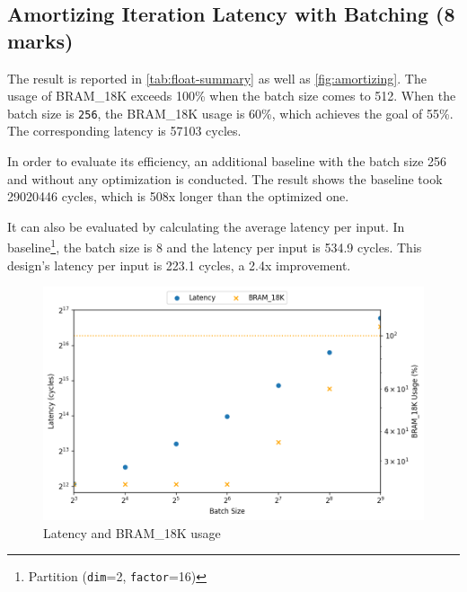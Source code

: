 \subsection{Amortizing Iteration Latency with Batching (8 marks)}
\label{sec:1d}


The result is reported in \autoref{tab:float-summary} as well as \autoref{fig:amortizing}.
The usage of BRAM\_18K exceeds 100\% when the batch size comes to 512.
When the batch size is \texttt{256}, the BRAM\_18K usage is 60\%, which achieves the goal of 55\%.
The corresponding latency is 57103 cycles.

In order to evaluate its efficiency, an additional baseline with the batch size 256 and without any optimization is conducted.
The result shows the baseline took 29020446 cycles, which is 508x longer than the optimized one.

It can also be evaluated by calculating the average latency per input.
In baseline\footnote{Partition (\texttt{dim}=2, \texttt{factor}=16)}, the batch size is 8 and the latency per input is 534.9 cycles.
This design's latency per input is 223.1 cycles, a 2.4x improvement.

\begin{figure}
    \centering
    \includegraphics[scale=0.64]{images/amortizing.png}
    \caption{Latency and BRAM\_18K usage}
    \label{fig:amortizing}
\end{figure}
